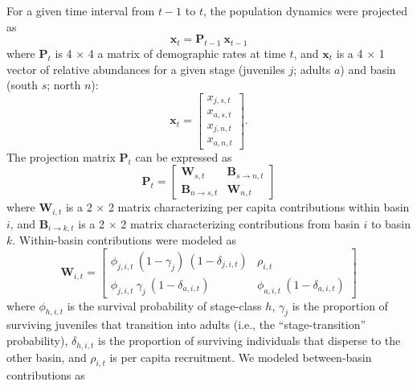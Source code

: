 \documentclass[11pt]{article}
\begin{document}
For a given time interval from $t-1$ to $t$, 
the population dynamics were projected as
%
\begin{equation} \label{eq:XPX}
    \mathbf{x}_t = \mathbf{P}_{t-1}~\mathbf{x}_{t-1}
\end{equation}
%
where $\mathbf{P}_{t}$ is 4 $\times$ 4 a matrix of demographic rates at time $t$, 
and $\mathbf{x}_{t}$ is a 4 $\times$ 1 vector of relative abundances 
for a given stage (juveniles $j$; adults $a$) 
and basin (south $s$; north $n$):
%
\begin{equation} \label{eq:X}
\mathbf{x}_{t} = 
\left[
\begin{array}{cccc}
    {x_{j,s,t}} \\
    {x_{a,s,t}} \\
    {x_{j,n,t}} \\
    {x_{a,n,t}}
    \end{array}
\right]
\text{.}
\end{equation}
%
The projection matrix $\mathbf{P}_{t}$ can be expressed as
%
\begin{equation} \label{eq:P}
\mathbf{P}_{t} = 
\left[
\begin{array}{c|ccc}
    \mathbf{W}_{s,t}  & \mathbf{B}_{s\rightarrow n,t} \\
    \hline
    \mathbf{B}_{n\rightarrow s,t} & \mathbf{W}_{n,t}
    \end{array}
\right]
\end{equation}
%
where $\mathbf{W}_{i,t}$ is a 2 $\times$ 2 matrix characterizing 
per capita contributions within basin $i$,
and $\mathbf{B}_{i\rightarrow k,t}$ is a 2 $\times$ 2 matrix characterizing 
contributions from basin $i$ to basin $k$.
Within-basin contributions were modeled as 
\begin{equation} \label{eq:W}
\mathbf{W}_{i,t} = 
\left[
\begin{array}{cccc}
    \phi_{j,i,t}~(1-\gamma_{j})~(1-\delta_{j,i,t}) & 
    \rho_{i,t} \\
    \phi_{j,i,t}~\gamma_{j}~(1-\delta_{a,i,t}) & 
    \phi_{a,i,t}~(1-\delta_{a,i,t})
    \end{array}
\right]
\end{equation}
%
where $\phi_{h,i,t}$ is the survival probability of stage-class $h$, 
$\gamma_{j}$ is the proportion of surviving juveniles that transition into adults
(i.e., the ``stage-transition'' probability),
$\delta_{h,i,t}$ is the proportion of surviving individuals that disperse to the other basin,
and $\rho_{i,t}$ is per capita recruitment.
We modeled between-basin contributions as
\end{document}

